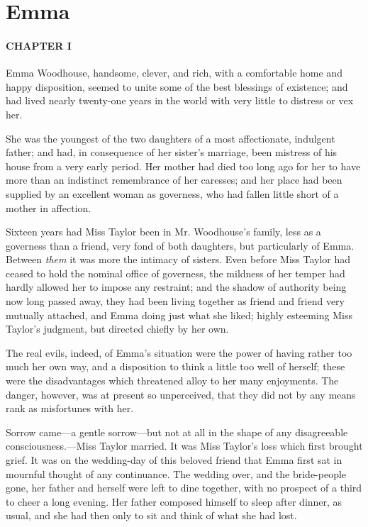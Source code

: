 \part{Emma}
\subsection[chapter-i]{\useURL[url1][][][]\from[url1]CHAPTER I}

Emma Woodhouse, handsome, clever, and rich, with a comfortable home and happy disposition, seemed to unite some of the best blessings of existence; and had lived nearly twenty-one years in the world with very little to distress or vex her.

She was the youngest of the two daughters of a most affectionate, indulgent father; and had, in consequence of her sister's marriage, been mistress of his house from a very early period. Her mother had died too long ago for her to have more than an indistinct remembrance of her caresses; and her place had been supplied by an excellent woman as governess, who had fallen little short of a mother in affection.

Sixteen years had Miss Taylor been in Mr. Woodhouse's family, less as a governess than a friend, very fond of both daughters, but particularly of Emma. Between {\em them} it was more the intimacy of sisters. Even before Miss Taylor had ceased to hold the nominal office of governess, the mildness of her temper had hardly allowed her to impose any restraint; and the shadow of authority being now long passed away, they had been living together as friend and friend very mutually attached, and Emma doing just what she liked; highly esteeming Miss Taylor's judgment, but directed chiefly by her own.

The real evils, indeed, of Emma's situation were the power of having rather too much her own way, and a disposition to think a little too well of herself; these were the disadvantages which threatened alloy to her many enjoyments. The danger, however, was at present so unperceived, that they did not by any means rank as misfortunes with her.

Sorrow came---a gentle sorrow---but not at all in the shape of any disagreeable consciousness.---Miss Taylor married. It was Miss Taylor's loss which first brought grief. It was on the wedding-day of this beloved friend that Emma first sat in mournful thought of any continuance. The wedding over, and the bride-people gone, her father and herself were left to dine together, with no prospect of a third to cheer a long evening. Her father composed himself to sleep after dinner, as usual, and she had then only to sit and think of what she had lost.

